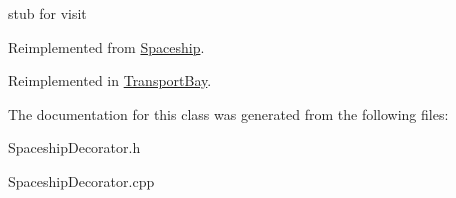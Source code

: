 stub for visit 

Reimplemented from \hyperlink{classSpaceship}{Spaceship}.



Reimplemented in \hyperlink{classTransportBay_a01efe0f6bd015b1ae194e111e5589444}{Transport\+Bay}.



The documentation for this class was generated from the following files\+:\begin{DoxyCompactItemize}
\item 
Spaceship\+Decorator.\+h\item 
Spaceship\+Decorator.\+cpp\end{DoxyCompactItemize}

